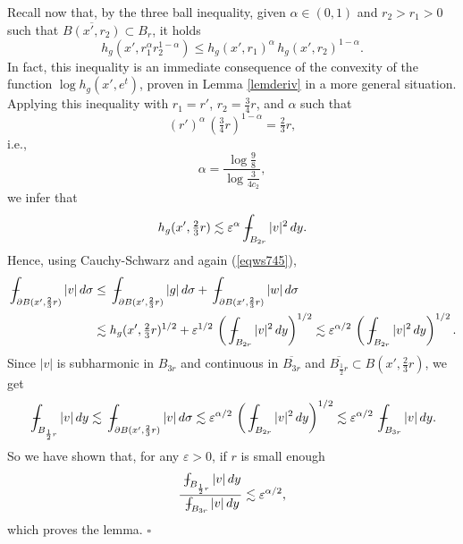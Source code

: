 \documentclass[11pt]{amsart}
\newcommand{\fiproof}{{\hspace*{\fill} $\square$ \vspace{2pt}}}
\newcommand{\rf}[1]{{(\ref{#1})}}
\newcommand{\ve}{{\varepsilon}}
\newcommand{\vvv}{{\vspace{3mm}}}
\def\Xint#1{\mathchoice
{\XXint\displaystyle\textstyle{#1}}%
{\XXint\textstyle\scriptstyle{#1}}%
{\XXint\scriptstyle\scriptscriptstyle{#1}}%
{\XXint\scriptscriptstyle\scriptscriptstyle{#1}}%
\!\int}
\def\XXint#1#2#3{{\setbox0=\hbox{$#1{#2#3}{\int}$ }
\vcenter{\hbox{$#2#3$ }}\kern-.58\wd0}}
\def\avint{\;\Xint-}
\theoremstyle{definition}
\theoremstyle{remark}
\numberwithin{equation}{section}
\begin{document}
Recall now that, by the three ball inequality, given $\alpha\in (0,1)$ and  $r_2>r_1>0$ such that
$\overline{B(x',r_2)}\subset B_r$, it holds
$$h_g(x',r_1^\alpha r_2^{1-\alpha}) \leq h_g(x',r_1)^\alpha \,h_g(x',r_2)^{1-\alpha}.$$
In fact, this inequality is an immediate consequence of the convexity of the function $\log h_g(x',e^t)$,
proven in Lemma \ref{lemderiv} in a more general situation. Applying this inequality with
$r_1=r'$, $r_2=\frac34r$, and $\alpha$ such that
$$(r')^\alpha \,(\tfrac34r)^{1-\alpha} = \tfrac23 r,$$
i.e., 
$$\alpha = \frac{\log\frac98}{\log\frac 3{4c_2}},$$
we infer that
$$h_g(x',\tfrac23r) \lesssim
\ve^\alpha \avint_{B_{2r}}|v|^2\,dy.$$
Hence, using Cauchy-Schwarz and again \rf{eqws745},
\begin{align*}
\avint_{\partial B(x',\frac23r)} |v| \,d\sigma & \leq 
\avint_{\partial B(x',\frac23r)} |g| \,d\sigma + 
\avint_{\partial B(x',\frac23r)} |w| \,d\sigma \\
& \lesssim h_g(x',\tfrac23r)^{1/2} +
 \ve^{1/2}\,  \left(\avint_{B_{2r}}|v|^2\,dy\right)^{1/2} \lesssim \ve^{\alpha/2}\,  \left(\avint_{B_{2r}}|v|^2\,dy\right)^{1/2}.
 \end{align*}
Since $|v|$ is subharmonic in $B_{3r}$ and continuous in $\overline{B_{3r}}$ and 
$\overline{B_{\frac12 r}}\subset B(x',\frac23 r)$, we get
$$\avint_{B_{\frac12 r}} |v|\,dy\lesssim \avint_{\partial B(x',\frac23r)} |v| \,d\sigma 
\lesssim \ve^{\alpha/2}\,  \left(\avint_{B_{2r}}|v|^2\,dy\right)^{1/2}
\lesssim \ve^{\alpha/2}\,  \avint_{B_{3r}}|v|\,dy.$$
So we have shown that, for any $\ve>0$, if $r$ is small enough
$$\frac{\avint_{B_{\frac12 r}} |v|\,dy}{ \avint_{B_{3r}}|v|\,dy}\lesssim \ve^{\alpha/2},$$
which proves the lemma.
\fiproof







\vvv
\end{document}
